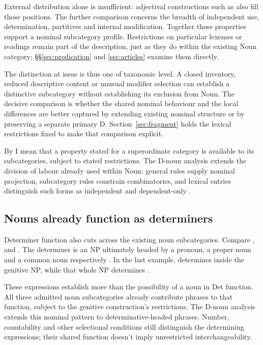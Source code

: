 \documentclass[12pt]{article}
\begin{document}
External distribution alone is insufficient: adjectival constructions such as  also fill those positions. The further comparison concerns the breadth of independent use, determination, partitives and internal modification. Together these properties support a nominal subcategory profile. Restrictions on particular lexemes or readings remain part of the description, just as they do within the existing Noun category; §§\ref{sec:predication} and \ref{sec:articles} examine them directly.

The distinction at issue is thus one of taxonomic level. A closed inventory, reduced descriptive content or unusual modifier selection can establish a distinctive subcategory without establishing its exclusion from Noun. The decisive comparison is whether the shared nominal behaviour and the local differences are better captured by extending existing nominal structure or by preserving a separate primary D. Section~\ref{sec:fragment} holds the lexical restrictions fixed to make that comparison explicit.

By  I mean that a property stated for a superordinate category is available to its subcategories, subject to stated restrictions. The D-noun analysis extends the division of labour already used within Noun: general rules supply nominal projection, subcategory rules constrain combinatorics, and lexical entries distinguish such forms as independent  and dependent-only .

\subsection{Nouns already function as determiners}\label{sec:bridge}

Determiner function also cuts across the existing noun subcategories. Compare ,  and . The determiner is an NP ultimately headed by a pronoun, a proper noun and a common noun respectively \citep[354--355, 470--471]{huddleston2002}. In the last example,  determines  inside the genitive NP, while that whole NP determines .

These expressions establish more than the possibility of a noun in Det function. All three admitted noun subcategories already contribute phrases to that function, subject to the genitive construction's restrictions. The D-noun analysis extends this nominal pattern to determinative-headed phrases. Number, countability and other selectional conditions still distinguish the determining expressions; their shared function doesn't imply unrestricted interchangeability.
\end{document}
